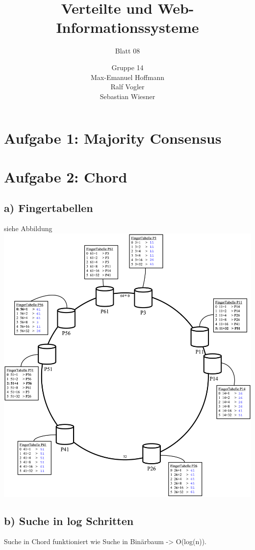\documentclass[11pt,a4paper]{scrartcl}
\begin{document}
\author{Gruppe 14\\Max-Emanuel Hoffmann\\Ralf Vogler\\Sebastian Wiesner}
\title{Verteilte und Web-Informationssysteme}
\subtitle{Blatt 08}

\maketitle

\section*{Aufgabe 1: Majority Consensus}


\section*{Aufgabe 2: Chord}
\subsection*{a) Fingertabellen}
siehe Abbildung\\
\includegraphics[width=\textwidth]{Chord1.png}


\subsection*{b) Suche in log Schritten}
Suche in Chord funktioniert wie Suche in Binärbaum -> O(log(n)).
\end{document}
